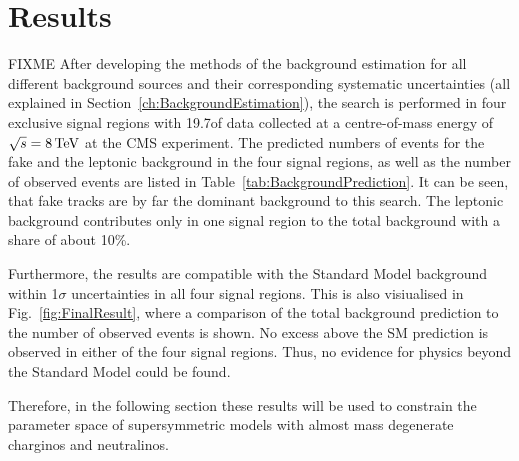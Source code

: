 \FloatBarrier
\chapter{Results}
\label{sec:Results}
FIXME
After developing the methods of the background estimation for all different background sources and their corresponding systematic uncertainties (all explained in Section~\ref{ch:BackgroundEstimation}), 
the search is performed in four exclusive signal regions with 19.7\fbinv of data collected at a centre-of-mass energy of $\sqrt{s} = 8\,\text{Te}\kern-0.06667em\text{V}$ at the CMS experiment.
The predicted numbers of events for the fake and the leptonic background in the four signal regions, as well as the number of observed events are listed in Table~\ref{tab:BackgroundPrediction}.
It can be seen, that fake tracks are by far the dominant background to this search.
The leptonic background contributes only in one signal region to the total background with a share of about 10\%.

Furthermore, the results are compatible with the Standard Model background within 1$\sigma$ uncertainties in all four signal regions.
This is also visiualised in Fig.~\ref{fig:FinalResult}, where a comparison of the total background prediction to the number of observed events is shown.
No excess above the SM prediction is observed in either of the four signal regions.
Thus, no evidence for physics beyond the Standard Model could be found.

Therefore, in the following section these results will be used to constrain the parameter space of supersymmetric models with almost mass degenerate charginos and neutralinos.

